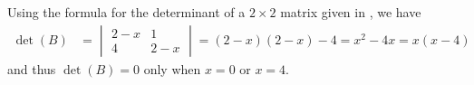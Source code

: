 Using the formula for the determinant of a $2\times 2$ matrix given in , we have 
%
\begin{align*}
\det{(B)} &= 
\begin{vmatrix} 
2 - x & 1\\ 
4 & 2-x 
\end{vmatrix} 
= (2 - x)(2 - x) - 4 = x^2 - 4x = x(x-4)
\end{align*}
%
and thus $\det{(B)} = 0$ only when $x=0$ or $x=4$.